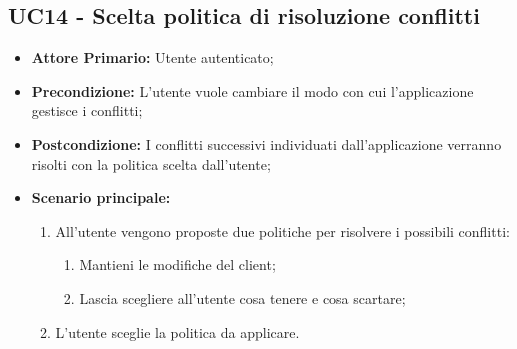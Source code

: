 \subsection{UC14 - Scelta politica di risoluzione conflitti}
\label{UC14}
\begin{itemize}
\item \textbf{Attore Primario:} Utente autenticato;
\item \textbf{Precondizione:} L'utente vuole cambiare il modo con cui l'applicazione gestisce i conflitti;
\item \textbf{Postcondizione:} I conflitti successivi individuati dall'applicazione verranno risolti con la politica scelta dall'utente;
\item \textbf{Scenario principale:}
    \begin{enumerate}
    \item All'utente vengono proposte due politiche per risolvere i possibili conflitti:
        \begin{enumerate}
        \item Mantieni le modifiche del client;
        \item Lascia scegliere all'utente cosa tenere e cosa scartare;
        \end{enumerate}
    \item L'utente sceglie la politica da applicare.
    \end{enumerate}
\end{itemize}